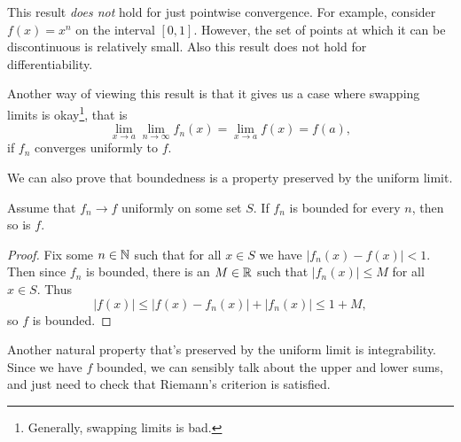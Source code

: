 \documentclass[a4paper]{scrartcl}
\begin{document}
\begin{remark}
    This result \emph{does not} hold for just pointwise convergence. For example, consider $f(x) = x^n$ on the interval $[0, 1]$. However, the set of points at which it can be discontinuous is relatively small. Also this result does not hold for differentiability.
\end{remark}

Another way of viewing this result is that it gives us a case where swapping limits is okay\footnote{Generally, swapping limits is bad.}, that is 
$$
    \lim_{x \to a} \lim_{n \to \infty} f_n(x) = \lim_{x \to a} f(x) = f(a),
$$
if $f_n$ converges uniformly to $f$.

We can also prove that boundedness is a property preserved by the uniform limit.

\begin{lemma}\label{lemma:uniform-bounded}
Assume that $f_n \rightarrow f$ uniformly on some set $S$.  
If $f_n$ is bounded for every $n$, then so is $f$.  
\end{lemma}
\begin{proof}
Fix some $n \in \mathbb{N}$ such that for all $x \in S$ we have $|f_n(x) - f(x)| < 1$. Then since $f_n$ is bounded, there is an $M \in \mathbb{R}$ such that $|f_n(x)| \leq M$ for all $x \in S$. Thus
$$
    |f(x)| \leq |f(x) - f_n(x)| + |f_n(x)| \leq 1 + M,
$$
so $f$ is bounded.
\end{proof}

Another natural property that's preserved by the uniform limit is integrability. Since we have $f$ bounded, we can sensibly talk about the upper and lower sums, and just need to check that Riemann's criterion is satisfied.

\end{document}
